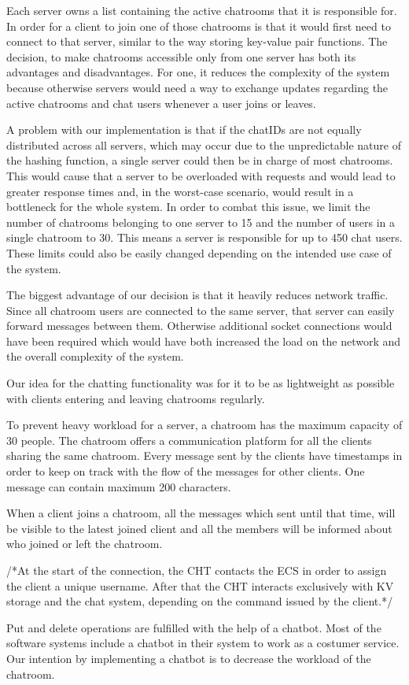 Each server owns a list containing the active chatrooms that it is responsible for. In order for a client to join one of those chatrooms is that it would first need to connect to that server, similar to the way storing key-value pair functions. The decision, to make chatrooms accessible only from one server has both its advantages and disadvantages. For one, it reduces the complexity of the system because otherwise servers would need a way to exchange updates regarding the active chatrooms and chat users whenever a user joins or leaves.

A problem with our implementation is that if the chatIDs are not equally distributed across all servers, which may occur due to the unpredictable nature of the hashing function, a single server could then be in charge of most chatrooms. This would cause that a server to be overloaded with requests and would lead to greater response times and, in the worst-case scenario, would result in a bottleneck for the whole system. In order to combat this issue, we limit the number of chatrooms belonging to one server to 15 and the number of users in a single chatroom to 30. This means a server is responsible for up to 450 chat users. These limits could also be easily changed depending on the intended use case of the system.

The biggest advantage of our decision is that it heavily reduces network traffic. Since all chatroom users are connected to the same server, that server can easily forward messages between them. Otherwise additional socket connections would have been required which would have both increased the load on the network and the overall complexity of the system.

Our idea for the chatting functionality was for it to be as lightweight as possible with clients entering and leaving chatrooms regularly.

To prevent heavy workload for a server, a chatroom has the maximum capacity of 30 people. The chatroom offers a communication platform for all the clients sharing the same chatroom. Every message sent by the clients have timestamps in order to keep on track with the flow of the messages for other clients. One message can contain maximum 200 characters.

When a client joins a chatroom, all the messages which sent until that time, will be visible to the latest joined client and all the members will be informed about who joined or left the chatroom. 


/*At the start of the connection, the CHT contacts the ECS in order to assign the client a unique username. After that the CHT interacts exclusively with KV storage and the chat system, depending on the command issued by the client.*/


Put and delete operations are fulfilled with the help of a chatbot. Most of the software systems include a chatbot in their system to work as a costumer service. Our intention by implementing a chatbot is to decrease the workload of the chatroom.
